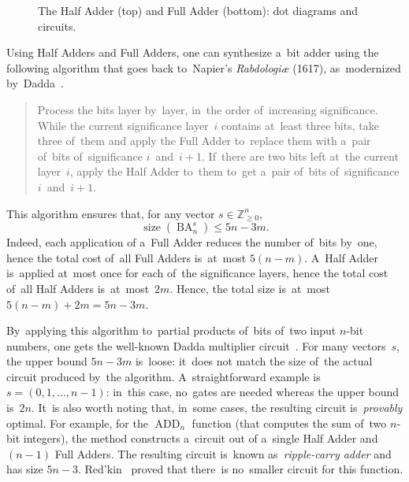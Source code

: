 \documentclass[sigconf, review, anonymous]{acmart}
\DeclareMathOperator{\ADD}{ADD}
\DeclareMathOperator{\BA}{BA}
\begin{document}
\begin{figure}
\begin{center}
    \end{center}
    \caption{The Half Adder (top) and Full Adder (bottom): dot diagrams and circuits.}
    \label{figure:sum23}
\end{figure}


Using Half Adders and Full Adders, one can synthesize a~bit adder using the following algorithm that goes back to~Napier's \emph{Rabdologiæ} (1617),
as~modernized by~Dadda~\cite{dadda}.
\begin{quote}
	Process the bits layer by~layer, in~the order of~increasing significance.
	While the current significance layer~$i$ contains at~least three bits,
	take three of~them and apply the Full Adder to~replace them with a~pair of~bits
	of~significance $i$~and~$i+1$. If~there are two bits left at~the current layer~$i$, apply the Half Adder to~them to~get a~pair of~bits of~significance $i$~and~$i+1$.
\end{quote}
This algorithm ensures that, for any vector $s \in \mathbb{Z}_{\ge 0}^n$,
\[\operatorname{size}(\BA_n^s) \le 5n-3m.\]
Indeed, each application of a~Full Adder reduces the number of~bits by~one,
hence the total cost of~all Full Adders is~at~most $5(n-m)$. A~Half Adder is~applied at~most once for each of~the significance layers, hence
the total cost of~all Half Adders is~at~most~$2m$. Hence, the total size
is~at~most $5(n-m)+2m=5n-3m$.

By~applying this algorithm to~partial products of~bits of~two input $n$-bit numbers, one gets the well-known Dadda multiplier circuit~\cite{dadda}.
For many vectors~$s$, the upper bound
$5n-3m$ is~loose:
it~does not match the size of~the actual circuit
produced by~the algorithm.
A~straightforward example is $s=(0,1,\dotsc,n-1)$:
in~this case, no~gates are needed whereas the upper bound is~$2n$.
It~is also worth noting that, in~some cases, the resulting circuit
is~\emph{provably} optimal.
For example, for the $\ADD_n$ function (that computes the sum of~two $n$-bit integers),
the method constructs a~circuit out of a~single Half Adder and $(n-1)$
Full Adders. The resulting circuit is~known as~\emph{ripple-carry adder} and has size $5n-3$.
Red'kin~\cite{Red81} proved that there~is no~smaller circuit
for this function.
\end{document}
